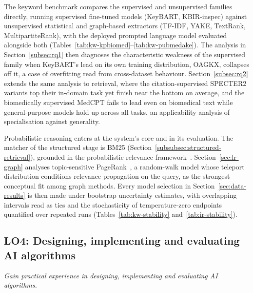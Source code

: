 The keyword benchmark compares the supervised and unsupervised families
directly, running supervised fine-tuned models (KeyBART, KBIR-inspec)
against unsupervised statistical and graph-based extractors (TF-IDF,
YAKE, TextRank, MultipartiteRank), with the deployed prompted language
model evaluated alongside both
(Tables~\ref{tab:kw-kpbiomed}--\ref{tab:kw-pubmedake}). The analysis in
Section~\ref{subsec:rq1} then diagnoses the characteristic weakness of the
supervised family when KeyBART's lead on its own training distribution,
OAGKX, collapses off it, a case of overfitting read from cross-dataset
behaviour. Section~\ref{subsec:rq2} extends the same analysis to retrieval,
where the citation-supervised SPECTER2 variants top their in-domain task
yet finish near the bottom on average, and the biomedically supervised
MedCPT fails to lead even on biomedical text while general-purpose models
hold up across all tasks, an applicability analysis of specialisation
against generality.

Probabilistic reasoning enters at the system's core and in its evaluation.
The matcher of the structured stage is BM25 (Section~\ref{subsubsec:structured-retrieval}),
grounded in the probabilistic relevance framework~\cite{robertson1994bm25}.
Section~\ref{sec:lr-graph} analyses topic-sensitive
PageRank~\cite{haveliwala2002tspr}, a random-walk model whose teleport
distribution conditions relevance propagation on the query, as the
strongest conceptual fit among graph methods. Every model selection in
Section~\ref{sec:data-results} is then made under bootstrap uncertainty
estimates, with overlapping intervals read as ties and the stochasticity of
temperature-zero endpoints quantified over repeated runs
(Tables~\ref{tab:kw-stability} and~\ref{tab:ir-stability}).

\subsection{LO4: Designing, implementing and evaluating AI algorithms}
\textit{Gain practical experience in designing, implementing and evaluating
AI algorithms.}

